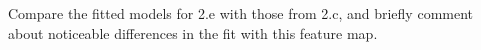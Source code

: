 \item {}

Compare the fitted models for 2.e with those from 2.c, and briefly comment about noticeable differences in the fit with this feature map.
